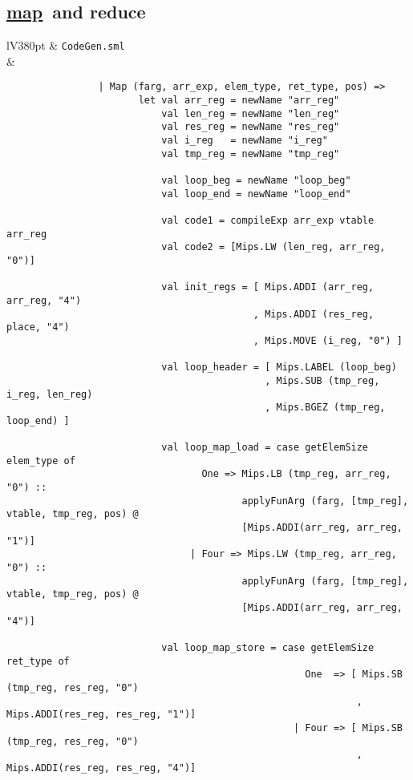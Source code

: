 \documentclass[a4paper]{article}
\begin{document}
\begin{appendices}
	\renewcommand\thetable{\thesection\arabic{table}}
	\renewcommand\thefigure{\thesection\arabic{figure}}
	\section{\underline{map}\ and reduce} \label{app:CodeGenMap}
	\begin{center}	
		\begin{tabular}{lV{380pt}}
			\toprule
			& \verb|CodeGen.sml|\\
			\midrule
			&
			\begin{verbatim}		
				| Map (farg, arr_exp, elem_type, ret_type, pos) => 
				       let val arr_reg = newName "arr_reg"
				           val len_reg = newName "len_reg"
				           val res_reg = newName "res_reg"
				           val i_reg   = newName "i_reg"
				           val tmp_reg = newName "tmp_reg"
				
				           val loop_beg = newName "loop_beg"
				           val loop_end = newName "loop_end"
				
				           val code1 = compileExp arr_exp vtable arr_reg
				           val code2 = [Mips.LW (len_reg, arr_reg, "0")]
				
				           val init_regs = [ Mips.ADDI (arr_reg, arr_reg, "4")
				                           , Mips.ADDI (res_reg, place, "4") 
				                           , Mips.MOVE (i_reg, "0") ]
				
				           val loop_header = [ Mips.LABEL (loop_beg)
				                             , Mips.SUB (tmp_reg, i_reg, len_reg)
				                             , Mips.BGEZ (tmp_reg, loop_end) ]
				
				           val loop_map_load = case getElemSize elem_type of
				                  One => Mips.LB (tmp_reg, arr_reg, "0") ::
				                         applyFunArg (farg, [tmp_reg], vtable, tmp_reg, pos) @ 
				                         [Mips.ADDI(arr_reg, arr_reg, "1")]
				                | Four => Mips.LW (tmp_reg, arr_reg, "0") ::
				                         applyFunArg (farg, [tmp_reg], vtable, tmp_reg, pos) @ 
				                         [Mips.ADDI(arr_reg, arr_reg, "4")]
				
				           val loop_map_store = case getElemSize ret_type of
				                                    One  => [ Mips.SB (tmp_reg, res_reg, "0")
				                                             , Mips.ADDI(res_reg, res_reg, "1")]
				                                  | Four => [ Mips.SB (tmp_reg, res_reg, "0")
				                                             , Mips.ADDI(res_reg, res_reg, "4")]
				

\end{verbatim}
\end{tabular}
\end{center}
\end{appendices}
\end{document}

